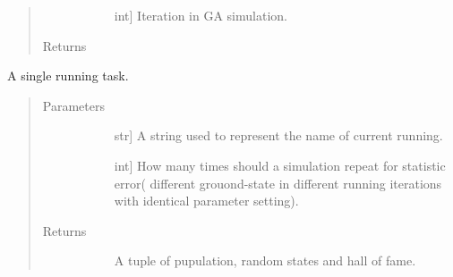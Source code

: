 \documentclass[letterpaper,10pt,english]{sphinxmanual}
\begin{document}
\begin{fulllineitems}
\begin{fulllineitems}
\begin{quote}
\begin{description}
\begin{description}
\item[{}] \leavevmode{[}int{]}
Iteration in GA simulation.

\end{description}

\item[{Returns}] \leavevmode\begin{description}
\item[{}] \leavevmode
\end{description}

\end{description}\end{quote}

\end{fulllineitems}


\begin{fulllineitems}
\label{\detokenize{pygace.examples.hfo2:pygace.examples.hfo2.hfo2_gace.HFO2App.single_run}}
A single running task.
\begin{quote}\begin{description}
\item[{Parameters}] \leavevmode\begin{description}
\item[{}] \leavevmode{[}str{]}
A string used to represent the name of current running.

\item[{}] \leavevmode{[}int{]}
How many times should a simulation repeat for statistic error(
different grouond-state in different running iterations with
identical parameter setting).

\end{description}

\item[{Returns}] \leavevmode\begin{description}
\item[{}] \leavevmode
A tuple of pupulation, random states and hall of fame.

\end{description}

\end{description}\end{quote}


\end{fulllineitems}
\end{fulllineitems}
\end{document}
